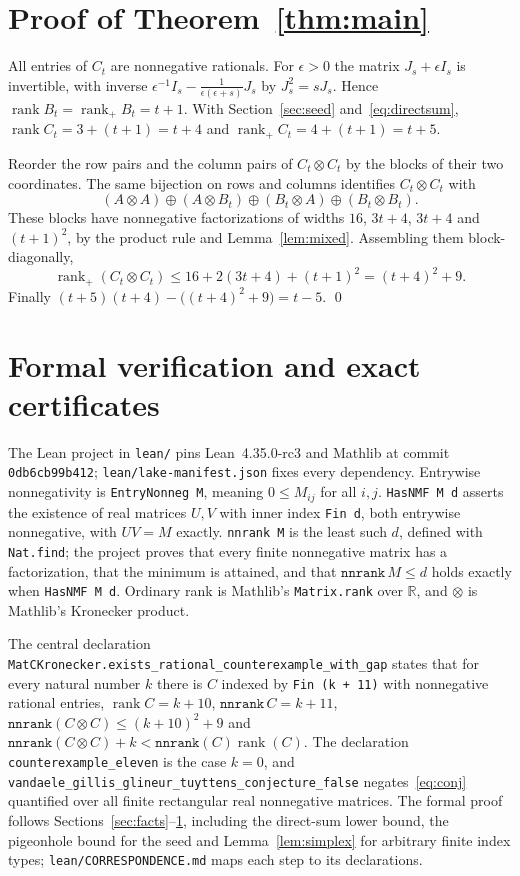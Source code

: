 \documentclass[11pt]{article}
\theoremstyle{remark}
\newcommand{\code}[1]{\nolinkurl{#1}}
\newcommand{\rk}{\operatorname{rank}}
\newcommand{\rp}{\operatorname{rank}_+}
\begin{document}
\section{Proof of Theorem~\ref{thm:main}}\label{sec:proof}

All entries of $C_t$ are nonnegative rationals. For $\epsilon>0$ the matrix $J_s+\epsilon I_s$ is invertible, with inverse $\epsilon^{-1}I_s-\frac{1}{\epsilon(\epsilon+s)}J_s$ by $J_s^2=sJ_s$. Hence $\rk B_t=\rp B_t=t+1$. With Section~\ref{sec:seed} and~\eqref{eq:directsum}, $\rk C_t=3+(t+1)=t+4$ and $\rp C_t=4+(t+1)=t+5$.

Reorder the row pairs and the column pairs of $C_t\otimes C_t$ by the blocks of their two coordinates. The same bijection on rows and columns identifies $C_t\otimes C_t$ with
\[
(A\otimes A)\oplus(A\otimes B_t)\oplus(B_t\otimes A)\oplus(B_t\otimes B_t).
\]
These blocks have nonnegative factorizations of widths $16$, $3t+4$, $3t+4$ and $(t+1)^2$, by the product rule and Lemma~\ref{lem:mixed}. Assembling them block-diagonally,
\[
\rp(C_t\otimes C_t)\le16+2(3t+4)+(t+1)^2=(t+4)^2+9 .
\]
Finally $(t+5)(t+4)-\bigl((t+4)^2+9\bigr)=t-5$. \qed

\section{Formal verification and exact certificates}\label{sec:lean}

The Lean project in \code{lean/} pins Lean~4.35.0-rc3 and Mathlib at commit \code{0db6cb99b412}; \code{lean/lake-manifest.json} fixes every dependency. Entrywise nonnegativity is \code{EntryNonneg M}, meaning $0\le M_{ij}$ for all $i,j$. \code{HasNMF M d} asserts the existence of real matrices $U,V$ with inner index \code{Fin d}, both entrywise nonnegative, with $UV=M$ exactly. \code{nnrank M} is the least such $d$, defined with \code{Nat.find}; the project proves that every finite nonnegative matrix has a factorization, that the minimum is attained, and that $\mathtt{nnrank}\,M\le d$ holds exactly when \code{HasNMF M d}. Ordinary rank is Mathlib's \code{Matrix.rank} over $\mathbb{R}$, and $\otimes$ is Mathlib's Kronecker product.

The central declaration \code{MatCKronecker.exists\_rational\_counterexample\_with\_gap} states that for every natural number $k$ there is $C$ indexed by \code{Fin (k + 11)} with nonnegative rational entries, $\rk C=k+10$, $\mathtt{nnrank}\,C=k+11$, $\mathtt{nnrank}(C\otimes C)\le(k+10)^2+9$ and $\mathtt{nnrank}(C\otimes C)+k<\mathtt{nnrank}(C)\rk(C)$. The declaration \code{counterexample\_eleven} is the case $k=0$, and \code{vandaele\_gillis\_glineur\_tuyttens\_conjecture\_false} negates~\eqref{eq:conj} quantified over all finite rectangular real nonnegative matrices. The formal proof follows Sections~\ref{sec:facts}--\ref{sec:proof}, including the direct-sum lower bound, the pigeonhole bound for the seed and Lemma~\ref{lem:simplex} for arbitrary finite index types; \code{lean/CORRESPONDENCE.md} maps each step to its declarations.
\end{document}
